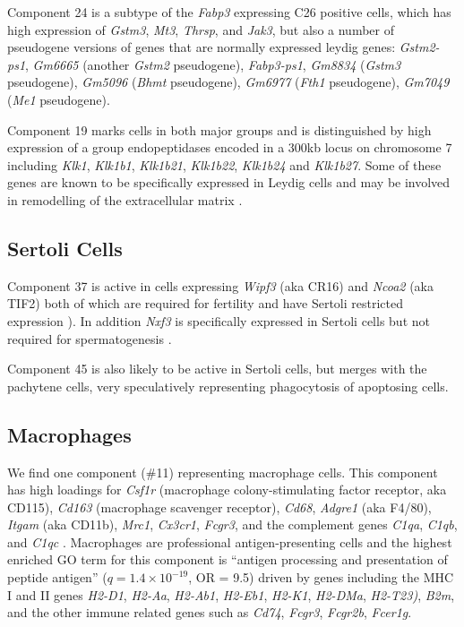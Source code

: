 Component 24 is a subtype of the \textit{Fabp3} expressing C26 positive cells, which has high expression of \textit{Gstm3}, \textit{Mt3}, \textit{Thrsp}, and \textit{Jak3}, but also a number of pseudogene versions of genes that are normally expressed leydig genes: \textit{Gstm2-ps1}, \textit{Gm6665} (another \textit{Gstm2} pseudogene), \textit{Fabp3-ps1}, \textit{Gm8834} (\textit{Gstm3} pseudogene), \textit{Gm5096} (\textit{Bhmt} pseudogene), \textit{Gm6977} (\textit{Fth1} pseudogene), \textit{Gm7049} (\textit{Me1} pseudogene).

Component 19 marks cells in both major groups and is distinguished by high expression of a group endopeptidases encoded in a 300kb locus on chromosome 7 including \textit{Klk1}, \textit{Klk1b1}, \textit{Klk1b21}, \textit{Klk1b22}, \textit{Klk1b24} and \textit{Klk1b27}. Some of these genes are known to be specifically expressed in Leydig cells and may be involved in remodelling of the extracellular matrix \parencite{Sanz2013RiboTag, Matsui2000Cloning, Matsui2001Mouse, Matsui2005Characterization}.

\subsection{Sertoli Cells}

Component 37 is active in cells expressing \textit{Wipf3} (aka CR16) and \textit{Ncoa2} (aka TIF2) both of which are required for fertility and have Sertoli restricted expression \parencite{Suetsugu2007Malespecific, Gehin2002Function}). In addition \textit{Nxf3} is specifically expressed in Sertoli cells but not required for spermatogenesis \parencite{Zhou2011Nxf3}.

Component 45 is also likely to be active in Sertoli cells, but merges with the pachytene cells, very speculatively representing phagocytosis of apoptosing cells.


\subsection{Macrophages}
We find one component (\#11) representing macrophage cells. This component has high loadings for \textit{Csf1r} (macrophage colony-stimulating factor receptor, aka CD115), \textit{Cd163} (macrophage scavenger receptor), \textit{Cd68}, \textit{Adgre1} (aka F4/80), \textit{Itgam} (aka CD11b), \textit{Mrc1}, \textit{Cx3cr1}, \textit{Fcgr3}, and the complement genes \textit{C1qa}, \textit{C1qb}, and \textit{C1qc} \parencite{Mossadegh-Keller2017Developmental, Fabriek2005macrophage, Sasmono2012Generation}. Macrophages are professional antigen-presenting cells and the highest enriched GO term for this component is ``antigen processing and presentation of peptide antigen'' ($q = 1.4\times10^{-19}$, OR = 9.5) driven by genes including the MHC I and II genes \textit{H2-D1}, \textit{H2-Aa}, \textit{H2-Ab1}, \textit{H2-Eb1}, \textit{H2-K1}, \textit{H2-DMa}, \textit{H2-T23)}, \textit{B2m}, and the other immune related genes such as \textit{Cd74}, \textit{Fcgr3}, \textit{Fcgr2b}, \textit{Fcer1g}.

